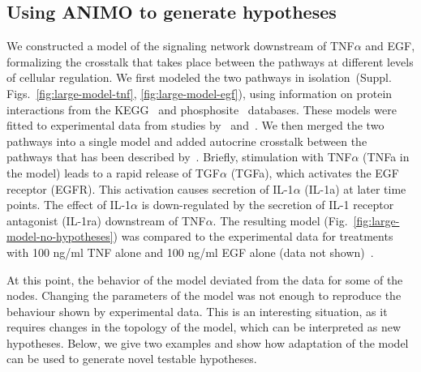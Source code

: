 \documentclass{bmcart}
\begin{document}
\subsection*{Using ANIMO to generate hypotheses}\label{subsec:case-study-larger}
We constructed a model of the signaling network downstream of TNF$\alpha$ and EGF, formalizing
the crosstalk that takes place between the pathways at different levels of cellular regulation.
We first modeled the two pathways in isolation~(Suppl. Figs.~\ref{fig:large-model-tnf}, \ref{fig:large-model-egf}),
using information on protein interactions from
the KEGG~\cite{kegg} and phosphosite~\cite{phosphosite} databases. These models were fitted to experimental data
from studies by~\cite{pathway-compendium} and~\cite{pathway-autocrine}.
We then merged the two pathways into a single model and added autocrine crosstalk between the pathways that has been
described by~\cite{pathway-autocrine}.
Briefly, stimulation with TNF$\alpha$ ({\sf TNFa} in the model) leads to a rapid release of TGF$\alpha$ ({\sf TGFa}),
which activates the EGF receptor ({\sf EGFR}).
This activation causes secretion of IL-1$\alpha$ ({\sf IL-1a}) at later time points.
The effect of IL-1$\alpha$ is down-regulated by the secretion of IL-1 receptor antagonist ({\sf IL-1ra})
downstream of TNF$\alpha$.
The resulting model (Fig.~\ref{fig:large-model-no-hypotheses}) was compared to the experimental data
for treatments with 100 ng/ml TNF alone and 100 ng/ml EGF alone (data not shown)~\cite{pathway-compendium}.

At this point, the behavior of the model deviated from the data for some of the nodes.
Changing the parameters of the model was not enough to reproduce the behaviour shown by experimental
data. This is an interesting situation, as it requires changes in the topology of
the model, which can be interpreted as new hypotheses. Below, we give two examples and show how
adaptation of the model can be used to generate novel testable hypotheses.
\end{document}

